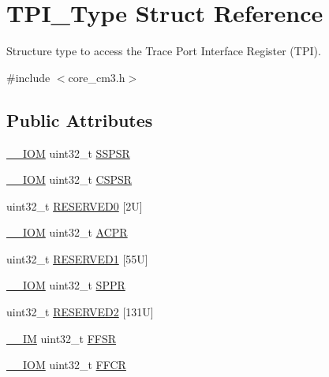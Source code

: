 \hypertarget{struct_t_p_i___type}{}\section{T\+P\+I\+\_\+\+Type Struct Reference}
\label{struct_t_p_i___type}


Structure type to access the Trace Port Interface Register (T\+PI).  




{\ttfamily \#include $<$core\+\_\+cm3.\+h$>$}

\subsection*{Public Attributes}
\begin{DoxyCompactItemize}
\item 
\hyperlink{core__sc300_8h_ab6caba5853a60a17e8e04499b52bf691}{\+\_\+\+\_\+\+I\+OM} uint32\+\_\+t \hyperlink{struct_t_p_i___type_a7b72598e20066133e505bb781690dc22}{S\+S\+P\+SR}
\item 
\hyperlink{core__sc300_8h_ab6caba5853a60a17e8e04499b52bf691}{\+\_\+\+\_\+\+I\+OM} uint32\+\_\+t \hyperlink{struct_t_p_i___type_a8826aa84e5806053395a742d38d59d0f}{C\+S\+P\+SR}
\item 
uint32\+\_\+t \hyperlink{struct_t_p_i___type_a409fb08ad6d58c17fcb7f59d65db6f93}{R\+E\+S\+E\+R\+V\+E\+D0} \mbox{[}2\+U\mbox{]}
\item 
\hyperlink{core__sc300_8h_ab6caba5853a60a17e8e04499b52bf691}{\+\_\+\+\_\+\+I\+OM} uint32\+\_\+t \hyperlink{struct_t_p_i___type_a9e5e4421ef9c3d5b7ff8b24abd4e99b3}{A\+C\+PR}
\item 
uint32\+\_\+t \hyperlink{struct_t_p_i___type_abc2f542560b78ccbbf0a44aadb5651fb}{R\+E\+S\+E\+R\+V\+E\+D1} \mbox{[}55\+U\mbox{]}
\item 
\hyperlink{core__sc300_8h_ab6caba5853a60a17e8e04499b52bf691}{\+\_\+\+\_\+\+I\+OM} uint32\+\_\+t \hyperlink{struct_t_p_i___type_a12f79d4e3ddc69893ba8bff890d04cc5}{S\+P\+PR}
\item 
uint32\+\_\+t \hyperlink{struct_t_p_i___type_ae6a238467f129df7440d97de8b58fe03}{R\+E\+S\+E\+R\+V\+E\+D2} \mbox{[}131\+U\mbox{]}
\item 
\hyperlink{core__sc300_8h_a4cc1649793116d7c2d8afce7a4ffce43}{\+\_\+\+\_\+\+IM} uint32\+\_\+t \hyperlink{struct_t_p_i___type_a6c47a0b4c7ffc66093ef993d36bb441c}{F\+F\+SR}
\item 
\hyperlink{core__sc300_8h_ab6caba5853a60a17e8e04499b52bf691}{\+\_\+\+\_\+\+I\+OM} uint32\+\_\+t \hyperlink{struct_t_p_i___type_a3f68b6e73561b4849ebf953a894df8d2}{F\+F\+CR}

\end{DoxyCompactItemize}
